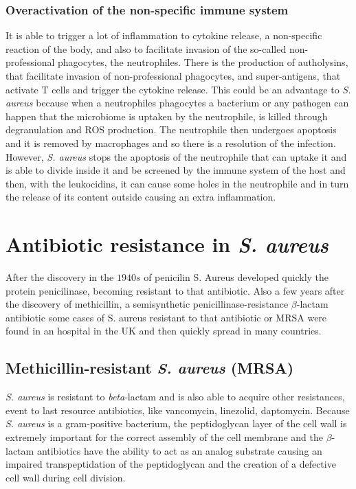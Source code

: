     \subsubsection{Overactivation of the non-specific immune system}
    It is able to trigger a lot of inflammation to cytokine release, a non-specific reaction of the body, and also to facilitate invasion of the so-called non-professional phagocytes, the neutrophiles.
    There is the production of autholysins, that facilitate invasion of non-professional phagocytes, and super-antigens, that activate T cells and trigger the cytokine release.
    This could be an advantage to \emph{S. aureus} because when a neutrophiles phagocytes a bacterium or any pathogen can happen that the microbiome is uptaken by the neutrophile, is killed through degranulation and ROS production.
    The neutrophile then undergoes apoptosis and it is removed by macrophages and so there is a resolution of the infection.
    However, \emph{S. aureus} stops the apoptosis of the neutrophile that can uptake it and is able to divide inside it and be screened by the immune system of the host and then, with the leukocidins, it can cause some holes in the neutrophile and in turn the release of its content outside causing an extra inflammation.

\section{Antibiotic resistance in \emph{S. aureus}}
After the discovery in the $1940s$ of penicilin S. Aureus developed quickly the protein penicilinase, becoming resistant to that antibiotic.
Also a few years after the discovery of methicillin, a semisynthetic penicillinase-resistance $\beta$-lactam antibiotic some cases of S. aureus resistant to that antibiotic or MRSA were found in an hospital in the UK and then quickly spread in many countries.

    \subsection{Methicillin-resistant \emph{S. aureus} (MRSA)}
    \emph{S. aureus} is resistant to \emph{beta}-lactam and is also able to acquire other resistances, event to last resource antibiotics, like vancomycin, linezolid, daptomycin.
    Because \emph{S. aureus} is a gram-positive bacterium, the peptidoglycan layer of the cell wall is extremely important for the correct assembly of the cell membrane and the $\beta$-lactam antibiotics have the ability to act as an analog substrate causing an impaired transpeptidation of the peptidoglycan and the creation of a defective cell wall during cell division.

